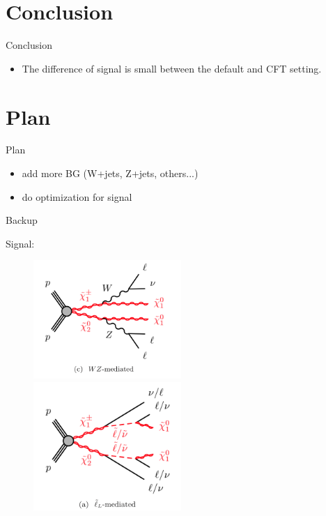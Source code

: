 \documentclass[mathserif,serif]{beamer}
\begin{document}



\section{Conclusion}
\begin{frame}{Conclusion}
\begin{itemize}
\item The difference of signal is small between the default and CFT setting.
\end{itemize}
\end{frame}

\section{Plan}
\begin{frame}{Plan}
\begin{itemize}
\item add more BG (W+jets, Z+jets, others...)
\item do optimization for signal
\end{itemize}
\end{frame}

\begin{frame}
\begin{center}
\huge
Backup
\end{center}
\end{frame}

\begin{frame}
\small
Signal:\\
\begin{figure}
\includegraphics[width=0.5\textwidth]{data/WZ.png}
\includegraphics[width=0.5\textwidth]{data/slepton.png}
\end{figure}
\end{frame}
\end{document}
